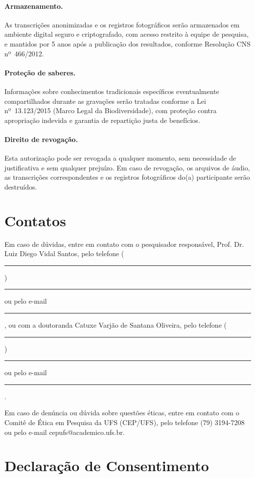 \documentclass[12pt,a4paper,brazil]{article}
\begin{document}
\paragraph{Armazenamento.} As transcrições anonimizadas e os registros fotográficos serão armazenados em ambiente digital seguro e criptografado, com acesso restrito à equipe de pesquisa, e mantidos por 5 anos após a publicação dos resultados, conforme Resolução CNS nº~466/2012.

\paragraph{Proteção de saberes.} Informações sobre conhecimentos tradicionais específicos eventualmente compartilhados durante as gravações serão tratadas conforme a Lei nº~13.123/2015 (Marco Legal da Biodiversidade), com proteção contra apropriação indevida e garantia de repartição justa de benefícios.

\paragraph{Direito de revogação.} Esta autorização pode ser revogada a qualquer momento, sem necessidade de justificativa e sem qualquer prejuízo. Em caso de revogação, os arquivos de áudio, as transcrições correspondentes e os registros fotográficos do(a) participante serão destruídos.

\vspace{0.5cm}

\section*{Contatos}

Em caso de dúvidas, entre em contato com o pesquisador responsável, Prof. Dr. Luiz Diego Vidal Santos, pelo telefone (\rule{1.5cm}{0.4pt}) \rule{3cm}{0.4pt} ou pelo e-mail \rule{5cm}{0.4pt}, ou com a doutoranda Catuxe Varjão de Santana Oliveira, pelo telefone (\rule{1.5cm}{0.4pt}) \rule{3cm}{0.4pt} ou pelo e-mail \rule{5cm}{0.4pt}.

Em caso de denúncia ou dúvida sobre questões éticas, entre em contato com o Comitê de Ética em Pesquisa da UFS (CEP/UFS), pelo telefone (79) 3194-7208 ou pelo e-mail cepufs@academico.ufs.br.

\vspace{1cm}

\section*{Declaração de Consentimento}
\end{document}
